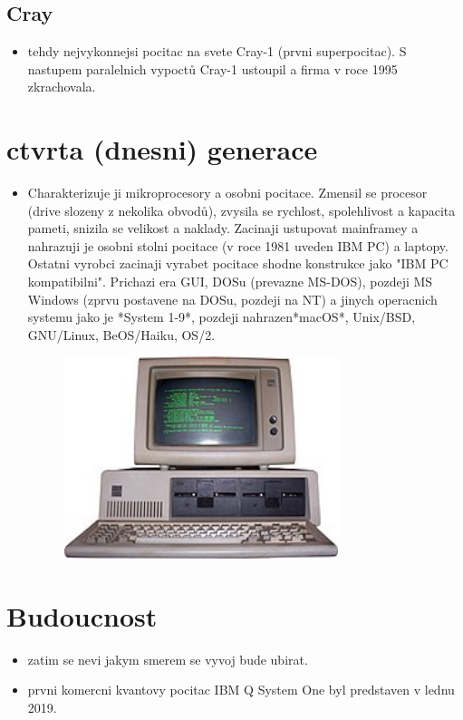 \documentclass[a4paper,12pt]{article}
\begin{document}
    \subsection{Cray}
        \begin{itemize}
            \item{tehdy nejvykonnejsi pocitac na svete Cray-1 (prvni superpocitac). S nastupem paralelnich vypoctů Cray-1 ustoupil a firma v roce 1995 zkrachovala.}
        \end{itemize}

\section{ctvrta (dnesni) generace}
    \begin{itemize}
        \item{Charakterizuje ji mikroprocesory a osobni pocitace. Zmensil se procesor (drive slozeny z nekolika obvodů), zvysila se rychlost, spolehlivost a kapacita pameti, snizila se velikost a naklady. Zacinaji ustupovat mainframey a nahrazuji je osobni stolni pocitace (v roce 1981 uveden IBM PC) a laptopy. Ostatni vyrobci zacinaji vyrabet pocitace shodne konstrukce jako "IBM PC kompatibilni". Prichazi era GUI, DOSu (prevazne MS-DOS), pozdeji MS Windows (zprvu postavene na DOSu, pozdeji na NT) a jinych operacnich systemu jako je *System 1-9*, pozdeji nahrazen*macOS*, Unix/BSD, GNU/Linux, BeOS/Haiku, OS/2.}
        \begin{figure}[htp]
            \centering
            \includegraphics[width=8cm]{TVP_11_9_23@6.jpg}
        \end{figure}
    \end{itemize}
    
\section{Budoucnost}
    \begin{itemize}
        \item{zatim se nevi jakym smerem se vyvoj bude ubirat.}
        \item{prvni komercni kvantovy pocitac IBM Q System One byl predstaven v lednu 2019.}
    \end{itemize}
\end{document}
